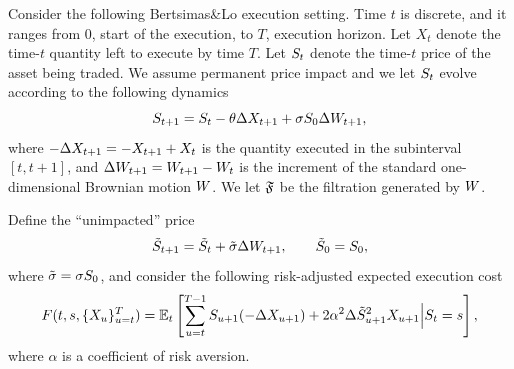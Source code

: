 \documentclass[10pt,a4paper]{article}
\begin{document}
\begin{exercise}
  \label{ex.rapp}
  Consider the following Bertsimas\&Lo execution setting. 
  Time $t$ is discrete, and it ranges from $0$, start of the execution, to $T$, execution horizon. 
  Let $X_t$ denote the time-$t$ quantity left to execute by time $T$. 
  Let $S_t$ denote the time-$t$ price of the asset being traded. 
  We assume permanent price impact and we let $S_t$ evolve according to the following dynamics
  \begin{equation*}
    S_{t+1} = S_t - \theta\Delta X_{t+1} + \sigma S_0 \Delta W_{t+1},  
  \end{equation*}
  where $-\Delta X_{t+1} = - X_{t+1} + X_{t}$ is the quantity executed in the subinterval $[t, t+1]$, 
  and $\Delta W_{t+1} = W_{t+1} - W_{t}$ is the increment of the standard one-dimensional Brownian motion $W$. 
  We let $\mathfrak{F}$ be the filtration generated by $W$. 

  Define the ``unimpacted'' price 
  \begin{equation*}
    \tilde{S}_{t+1} = \tilde{S}_{t} + \tilde{\sigma} \Delta W_{t+1}, \qquad \tilde{S}_{0} = S_{0}, 
  \end{equation*}
  where $\tilde{\sigma} = \sigma S_{0}$, 
  and consider the following risk-adjusted expected execution cost
  \begin{equation}
    \label{eq.raeec}
    F(t,s,\lbrace X_{u}\rbrace_{u=t}^{T})
    =
    \mathbb{{E}}_{t}
    \left[
      \sum_{u=t}^{T-1} S_{u+1}(-\Delta X_{u+1}) 
      + 2\alpha^{2} \Delta\tilde{S}^{2}_{u+1}X_{u+1} \Big\vert S_t = s 
    \right],
  \end{equation}
  where $\alpha$ is a coefficient of risk aversion.


\end{exercise}
\end{document}
